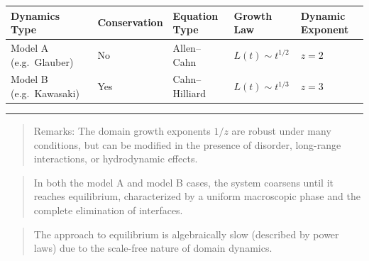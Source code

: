 \documentclass[
  letterpaper,
  enabledeprecatedfontcommands]{report}
\begin{document}
\begin{longtable}[]{@{}
  >{\raggedright\arraybackslash}p{}
  >{\raggedright\arraybackslash}p{}
  >{\raggedright\arraybackslash}p{}
  >{\raggedright\arraybackslash}p{}
  >{\raggedright\arraybackslash}p{}@{}}
\toprule\noalign{}
\begin{minipage}[b]{\linewidth}\raggedright
Dynamics Type
\end{minipage} & \begin{minipage}[b]{\linewidth}\raggedright
Conservation
\end{minipage} & \begin{minipage}[b]{\linewidth}\raggedright
Equation Type
\end{minipage} & \begin{minipage}[b]{\linewidth}\raggedright
Growth Law
\end{minipage} & \begin{minipage}[b]{\linewidth}\raggedright
Dynamic Exponent
\end{minipage} \\
\midrule\noalign{}
\endhead
\bottomrule\noalign{}
\endlastfoot
Model A (e.g.~Glauber) & No & Allen--Cahn & \(L(t) \sim t^{1/2}\) &
\(z = 2\) \\
Model B (e.g.~Kawasaki) & Yes & Cahn--Hilliard & \(L(t) \sim t^{1/3}\) &
\(z = 3\) \\
\end{longtable}

\begin{center}\rule{0.5\linewidth}{0.5pt}\end{center}

\begin{quote}
Remarks: The domain growth exponents \(1/z\) are robust under many
conditions, but can be modified in the presence of disorder, long-range
interactions, or hydrodynamic effects.
\end{quote}

\begin{quote}
In both the model A and model B cases, the system coarsens until it
reaches equilibrium, characterized by a uniform macroscopic phase and
the complete elimination of interfaces.
\end{quote}

\begin{quote}
The approach to equilibrium is algebraically slow (described by power
laws) due to the scale-free nature of domain dynamics.
\end{quote}
\end{document}
